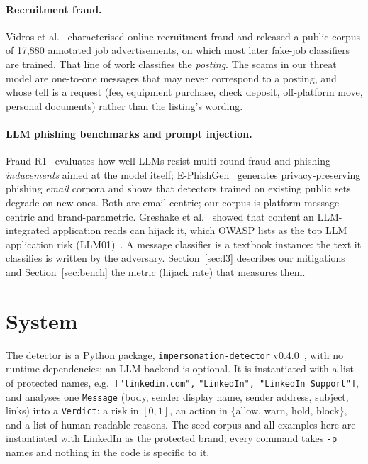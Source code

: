 \documentclass[10pt,twocolumn]{article}
\newcommand{\code}[1]{\texttt{#1}}
\begin{document}
\paragraph{Recruitment fraud.}
Vidros et al.~\cite{vidros2017recruitment} characterised online recruitment fraud and released a public corpus of 17{,}880 annotated job advertisements, on which most later fake-job classifiers are trained. That line of work classifies the \emph{posting}. The scams in our threat model are one-to-one messages that may never correspond to a posting, and whose tell is a request (fee, equipment purchase, check deposit, off-platform move, personal documents) rather than the listing's wording.

\paragraph{LLM phishing benchmarks and prompt injection.}
Fraud-R1~\cite{yang2025fraudr1} evaluates how well LLMs resist multi-round fraud and phishing \emph{inducements} aimed at the model itself; E-PhishGen~\cite{pajola2025ephishgen} generates privacy-preserving phishing \emph{email} corpora and shows that detectors trained on existing public sets degrade on new ones. Both are email-centric; our corpus is platform-message-centric and brand-parametric. Greshake et al.~\cite{greshake2023indirect} showed that content an LLM-integrated application reads can hijack it, which OWASP lists as the top LLM application risk (LLM01)~\cite{owasp_llm01}. A message classifier is a textbook instance: the text it classifies is written by the adversary. Section~\ref{sec:l3} describes our mitigations and Section~\ref{sec:bench} the metric (hijack rate) that measures them.

\section{System}
\label{sec:system}

\sloppypar The detector is a Python package, \code{impersonation-detector} v0.4.0~\cite{ezema2026detector}, with no runtime dependencies; an LLM backend is optional. It is instantiated with a list of protected names, e.g.\ \code{["linkedin.com",} \code{"LinkedIn", "LinkedIn Support"]}, and analyses one \code{Message} (body, sender display name, sender address, subject, links) into a \code{Verdict}: a risk in $[0,1]$, an action in \{allow, warn, hold, block\}, and a list of human-readable reasons. The seed corpus and all examples here are instantiated with LinkedIn as the protected brand; every command takes \code{-p} names and nothing in the code is specific to it.
\end{document}
